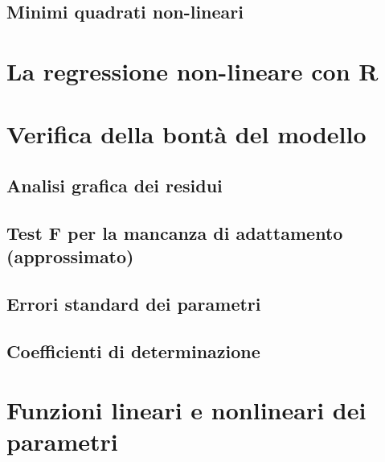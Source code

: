 \documentclass[a4paper,12pt,oneside]{book}
\begin{document}
\hypertarget{minimi-quadrati-non-lineari}{%
\subsection{Minimi quadrati non-lineari}\label{minimi-quadrati-non-lineari}}

\hypertarget{la-regressione-non-lineare-con-r}{%
\section{La regressione non-lineare con R}\label{la-regressione-non-lineare-con-r}}

\hypertarget{verifica-della-bontuxe0-del-modello}{%
\section{Verifica della bontà del modello}\label{verifica-della-bontuxe0-del-modello}}

\hypertarget{analisi-grafica-dei-residui-1}{%
\subsection{Analisi grafica dei residui}\label{analisi-grafica-dei-residui-1}}

\hypertarget{test-f-per-la-mancanza-di-adattamento-approssimato}{%
\subsection{Test F per la mancanza di adattamento (approssimato)}\label{test-f-per-la-mancanza-di-adattamento-approssimato}}

\hypertarget{errori-standard-dei-parametri-1}{%
\subsection{Errori standard dei parametri}\label{errori-standard-dei-parametri-1}}

\hypertarget{coefficienti-di-determinazione}{%
\subsection{Coefficienti di determinazione}\label{coefficienti-di-determinazione}}

\hypertarget{funzioni-lineari-e-nonlineari-dei-parametri}{%
\section{Funzioni lineari e nonlineari dei parametri}\label{funzioni-lineari-e-nonlineari-dei-parametri}}
\end{document}
